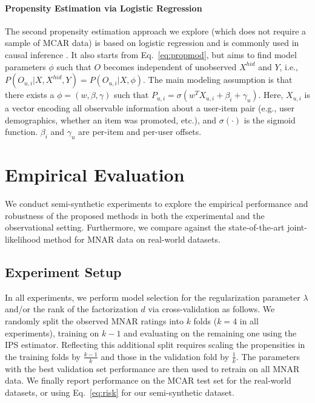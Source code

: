 \documentclass{article}
\newcommand{\user}{u}                       %
\newcommand{\movie}{i}                      %
\newcommand{\xpropobs}{X}                   %
\newcommand{\xpropobselem}[1]{\xpropobs_{#1}}
\newcommand{\xpropobsum}{\xpropobselem{\user,\movie}}
\newcommand{\xprophid}{X^{hid}}             %
\newcommand{\ytrue}{Y}                      %
\newcommand{\obs}{O}                        %
\newcommand{\obselem}[1]{\obs_{#1}}
\newcommand{\obsum}{\obselem{\user,\movie}}
\newcommand{\probobs}{P}                    %
\newcommand{\probobselem}[1]{\probobs_{#1}}
\newcommand{\probobsum}{\probobselem{\user,\movie}}
\begin{document}
\paragraph{Propensity Estimation via Logistic Regression}
\label{sec:prop_lr}
The second propensity estimation approach we explore %
(which does not require a sample of MCAR data) is based on logistic regression and is commonly used in causal inference \cite{Rosenbaum2002}. It also starts from Eq.~\eqref{eq:propmod}, but aims to find model parameters $\phi$ such that $\obs$ becomes independent of unobserved $\xprophid$ and $\ytrue$, i.e.,
$    P(\obsum|\xpropobs,\xprophid,\ytrue) = P(\obsum|\xpropobs,\phi).$
The main modeling assumption is that there exists a $\phi=(w, \beta, \gamma)$ such that 
$
    \probobsum = \sigma\left(w^T \xpropobsum + \beta_{\movie} + \gamma_{\user}\right).
$
Here, $\xpropobsum$ is a vector encoding all observable information about a user-item pair (e.g., user demographics, whether an item was promoted, etc.), and $\sigma(\cdot)$ is the sigmoid function. $\beta_{\movie}$ and $\gamma_{\user}$ are per-item and per-user offsets.

\section{Empirical Evaluation} \label{sec:exp}
We conduct semi-synthetic experiments to explore the empirical performance and robustness of the proposed methods in both the experimental and the observational setting. Furthermore, we compare against the state-of-the-art joint-likelihood method for MNAR data \cite{HL} on real-world datasets.

\subsection{Experiment Setup}
In all experiments, we perform model selection for the regularization parameter $\lambda$ and/or the rank of the factorization $d$ via cross-validation as follows. We randomly split the observed MNAR ratings into $k$ folds ($k = 4$ in all experiments), training on $k-1$ and evaluating on the remaining one using the IPS estimator. 
Reflecting this additional split %
requires scaling the propensities in the training folds by $\frac{k-1}{k}$ and those in the validation fold by $\frac{1}{k}$. 
The parameters with the best validation set performance are then used to retrain on all MNAR data.
We finally report performance on the MCAR test set for the real-world datasets, or using Eq.~\eqref{eq:risk} for our semi-synthetic dataset.
\end{document}
